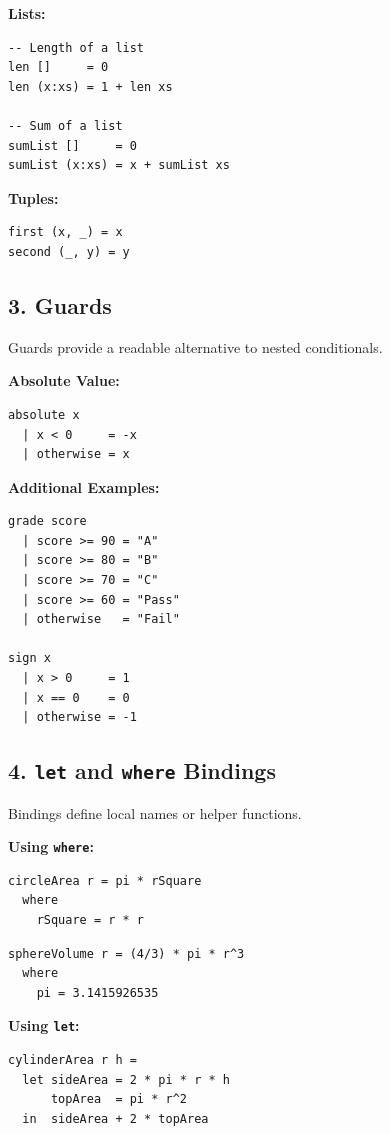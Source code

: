 \documentclass[12pt]{article}
\begin{document}
\textbf{Lists:}
\begin{verbatim}
-- Length of a list
len []     = 0
len (x:xs) = 1 + len xs

-- Sum of a list
sumList []     = 0
sumList (x:xs) = x + sumList xs
\end{verbatim}

\textbf{Tuples:}
\begin{verbatim}
first (x, _) = x
second (_, y) = y
\end{verbatim}

\subsection{3. Guards}

Guards provide a readable alternative to nested conditionals.

\textbf{Absolute Value:}
\begin{verbatim}
absolute x
  | x < 0     = -x
  | otherwise = x
\end{verbatim}

\textbf{Additional Examples:}

\begin{verbatim}
grade score
  | score >= 90 = "A"
  | score >= 80 = "B"
  | score >= 70 = "C"
  | score >= 60 = "Pass"
  | otherwise   = "Fail"

sign x
  | x > 0     = 1
  | x == 0    = 0
  | otherwise = -1
\end{verbatim}

\subsection{4. \texttt{let} and \texttt{where} Bindings}

Bindings define local names or helper functions.

\textbf{Using \texttt{where}:}
\begin{verbatim}
circleArea r = pi * rSquare
  where
    rSquare = r * r
\end{verbatim}

\begin{verbatim}
sphereVolume r = (4/3) * pi * r^3
  where
    pi = 3.1415926535
\end{verbatim}

\textbf{Using \texttt{let}:}
\begin{verbatim}
cylinderArea r h =
  let sideArea = 2 * pi * r * h
      topArea  = pi * r^2
  in  sideArea + 2 * topArea
\end{verbatim}
\end{document}
